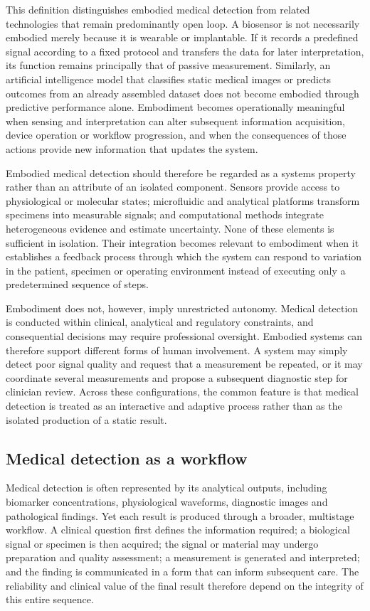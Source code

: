 \documentclass[12pt,a4paper]{article}
\begin{document}
This definition distinguishes embodied medical detection from related technologies that remain predominantly open loop. A biosensor is not necessarily embodied merely because it is wearable or implantable. If it records a predefined signal according to a fixed protocol and transfers the data for later interpretation, its function remains principally that of passive measurement. Similarly, an artificial intelligence model that classifies static medical images or predicts outcomes from an already assembled dataset does not become embodied through predictive performance alone. Embodiment becomes operationally meaningful when sensing and interpretation can alter subsequent information acquisition, device operation or workflow progression, and when the consequences of those actions provide new information that updates the system.

Embodied medical detection should therefore be regarded as a systems property rather than an attribute of an isolated component. Sensors provide access to physiological or molecular states; microfluidic and analytical platforms transform specimens into measurable signals; and computational methods integrate heterogeneous evidence and estimate uncertainty. None of these elements is sufficient in isolation. Their integration becomes relevant to embodiment when it establishes a feedback process through which the system can respond to variation in the patient, specimen or operating environment instead of executing only a predetermined sequence of steps.

Embodiment does not, however, imply unrestricted autonomy. Medical detection is conducted within clinical, analytical and regulatory constraints, and consequential decisions may require professional oversight. Embodied systems can therefore support different forms of human involvement. A system may simply detect poor signal quality and request that a measurement be repeated, or it may coordinate several measurements and propose a subsequent diagnostic step for clinician review. Across these configurations, the common feature is that medical detection is treated as an interactive and adaptive process rather than as the isolated production of a static result.

\subsection{Medical detection as a workflow}
\label{subsec:medical_detection_workflow}
Medical detection is often represented by its analytical outputs, including biomarker concentrations, physiological waveforms, diagnostic images and pathological findings. Yet each result is produced through a broader, multistage workflow. A clinical question first defines the information required; a biological signal or specimen is then acquired; the signal or material may undergo preparation and quality assessment; a measurement is generated and interpreted; and the finding is communicated in a form that can inform subsequent care. The reliability and clinical value of the final result therefore depend on the integrity of this entire sequence.
\end{document}

